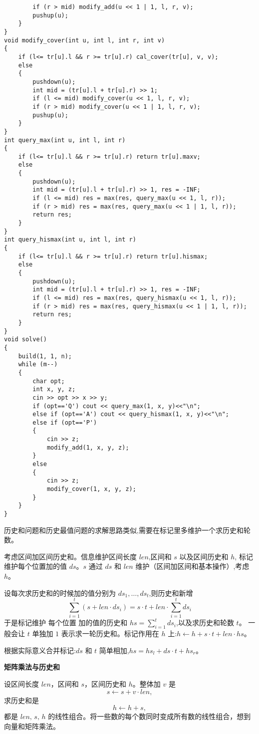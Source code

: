 \documentclass[a4paper, fontset=none]{ctexart}
\begin{document}
\begin{verbatim}
        if (r > mid) modify_add(u << 1 | 1, l, r, v);
        pushup(u);
    }
}
void modify_cover(int u, int l, int r, int v)
{
    if (l<= tr[u].l && r >= tr[u].r) cal_cover(tr[u], v, v);
    else
    {
        pushdown(u);
        int mid = (tr[u].l + tr[u].r) >> 1;
        if (l <= mid) modify_cover(u << 1, l, r, v);
        if (r > mid) modify_cover(u << 1 | 1, l, r, v);
        pushup(u);
    }
}
int query_max(int u, int l, int r)
{
    if (l<= tr[u].l && r >= tr[u].r) return tr[u].maxv;
    else
    {
        pushdown(u);
        int mid = (tr[u].l + tr[u].r) >> 1, res = -INF;
        if (l <= mid) res = max(res, query_max(u << 1, l, r));
        if (r > mid) res = max(res, query_max(u << 1 | 1, l, r));
        return res;
    }
}
int query_hismax(int u, int l, int r)
{
    if (l<= tr[u].l && r >= tr[u].r) return tr[u].hismax;
    else
    {
        pushdown(u);
        int mid = (tr[u].l + tr[u].r) >> 1, res = -INF;
        if (l <= mid) res = max(res, query_hismax(u << 1, l, r));
        if (r > mid) res = max(res, query_hismax(u << 1 | 1, l, r));
        return res;
    }
}
void solve()
{
    build(1, 1, n);
    while (m--)
    {
        char opt;
        int x, y, z;
        cin >> opt >> x >> y;
        if (opt=='Q') cout << query_max(1, x, y)<<"\n";
        else if (opt=='A') cout << query_hismax(1, x, y)<<"\n";
        else if (opt=='P')
        {
            cin >> z;
            modify_add(1, x, y, z);
        }
        else
        {
            cin >> z;
            modify_cover(1, x, y, z);
        }
    }
}
\end{verbatim}

历史和问题和历史最值问题的求解思路类似,需要在标记里多维护一个求历史和轮数。

考虑区间加区间历史和。信息维护区间长度 $len$,区间和 $s$ 以及区间历史和 $h$,
标记维护每个位置加的值 $ds$。$s$ 通过 $ds$ 和 $len$ 维护（区间加区间和基本操作）,考虑 $h$。

设每次求历史和的时候加的值分别为 $ds_1, \ldots, ds_t$,则历史和新增
\[
\sum_{i = 1} ^ t (s + len\cdot ds_i) = s\cdot t + len \cdot \sum_{i = 1} ^ t ds_i
\]
于是标记维护 每个位置 加的值的历史和 $hs = \sum_{i = 1} ^ t ds_i$,以及求历史和轮数 $t$。
一般会让 $t$ 单独加 $1$ 表示求一轮历史和。标记作用在 $h$ 上:$h\gets h + s\cdot t + len \cdot hs$。

根据实际意义合并标记:$ds$ 和 $t$ 简单相加,$hs = hs_l + ds\cdot t + hs_r$。


\textbf{矩阵乘法与历史和}

设区间长度 $len$，区间和 $s$，区间历史和 $h$。整体加 $v$ 是
\[
s \gets s + v \cdot len,
\]
求历史和是
\[
h \gets h + s,
\]
都是 $len,\, s,\, h$ 的线性组合。将一些数的每个数同时变成所有数的线性组合，想到向量和矩阵乘法。
\end{document}
